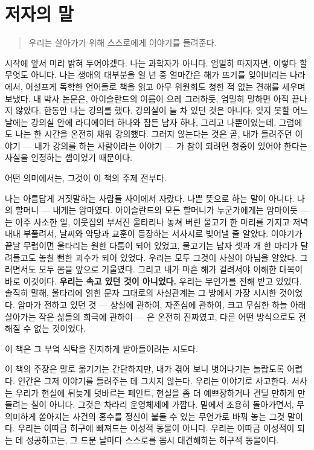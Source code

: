 \chapter*{저자의 말}
{}

\begin{quote}%
\centerline{우리는 살아가기 위해 스스로에게 이야기를 들려준다.}
%
\end{quote}

시작에 앞서 미리 밝혀 두어야겠다. 나는 과학자가 아니다. 엄밀히 따지자면, 이렇다 할 무엇도 아니다. 나는 생애의 대부분을 일 년 중 얼마간은 해가 뜨기를 잊어버리는 나라에서, 어설프게 독학한 언어들로 책을 읽고 아무 위원회도 청한 적 없는 견해를 세우며 보냈다. 내 박사 논문은, 아이슬란드의 여름이 으레 그러하듯, 엄밀히 말하면 아직 끝나지 않았다. 한동안 나는 강의를 했다. 강의실이 늘 차 있던 것은 아니다. 잊지 못할 어느 날에는 강의실 안에 라디에이터 하나와 잠든 남자 하나, 그리고 나뿐이었는데, 그럼에도 나는 한 시간을 온전히 채워 강의했다. 그러지 않는다는 것은 곧, 내가 들려주던 이야기 — 내가 강의를 하는 사람이라는 이야기 — 가 참이 되려면 청중이 있어야 한다는 사실을 인정하는 셈이었기 때문이다.

어떤 의미에서는, 그것이 이 책의 주제 전부다.

나는 아름답게 거짓말하는 사람들 사이에서 자랐다. 나쁜 뜻으로 하는 말이 아니다. 나의 할머니 — 내게는 암마였다. 아이슬란드의 모든 할머니가 누군가에게는 암마이듯 — 는 아주 사소한 일, 이웃집의 부서진 울타리나 놓쳐 버린 물고기 한 마리를 가지고 저녁 내내 부풀려서, 날씨와 악당과 교훈이 등장하는 서사시로 빚어낼 줄 알았다. 이야기가 끝날 무렵이면 울타리는 원한 다툼이 되어 있었고, 물고기는 남자 셋과 개 한 마리가 달려들고도 놓칠 뻔한 괴수가 되어 있었다. 우리는 모두 그것이 사실이 아님을 알았다. 그러면서도 모두 몸을 앞으로 기울였다. 그리고 내가 마흔 해가 걸려서야 이해한 대목이 바로 이것이다. \textbf{우리는 속고 있던 것이 아니었다.} 우리는 무언가를 전해 받고 있었다. 솔직히 말해, 울타리에 얽힌 문자 그대로의 사실관계는 그 방에서 가장 시시한 것이었다. 암마가 전하고 있던 것 — 상실에 관하여, 자존심에 관하여, 크고 무심한 하늘 아래 살아가는 작은 삶들의 희극에 관하여 — 은 온전히 진짜였고, 다른 어떤 방식으로도 전해질 수 없는 것이었다.

이 책은 그 부엌 식탁을 진지하게 받아들이려는 시도다.

이 책의 주장은 말로 옮기기는 간단하지만, 내가 겪어 보니 벗어나기는 놀랍도록 어렵다. 인간은 그저 이야기를 들려주는 데 그치지 않는다. 우리는 이야기로 사고한다. 서사는 우리가 현실에 뒤늦게 덧바르는 페인트, 현실을 좀 더 예쁘장하거나 견딜 만하게 만들려는 칠이 아니다. 그것은 차라리 운영체제에 가깝다. 밑에서 조용히 돌아가면서, 무의미하게 쏟아지는 사건의 홍수를 정신이 붙들 수 있는 무언가로 바꿔 놓는 그것 말이다. 우리는 이따금 허구에 빠져드는 이성적 동물이 아니다. 우리는 이따금 이성적이 되는 데 성공하고는, 그 드문 날마다 스스로를 몹시 대견해하는 허구적 동물이다.

